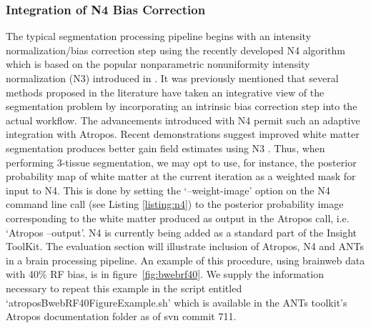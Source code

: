 \documentclass[11pt,english]{article}
\begin{document}
\subsubsection{Integration of N4 Bias Correction}
The typical segmentation processing pipeline begins with an intensity
normalization/bias correction step using the recently developed N4
algorithm \citep{Tustison2010} which is based on the popular
nonparametric nonuniformity intensity normalization (N3) introduced in \cite{Sled1998}.  It was previously mentioned that
several methods proposed in the literature have taken an integrative
view of the segmentation problem by incorporating an intrinsic bias
correction step into the actual workflow.  The
advancements introduced with N4 permit such an adaptive
integration with Atropos.  Recent demonstrations suggest improved
white matter segmentation produces better gain field estimates using
N3 \citep{Boyes2008}.  Thus, when performing 3-tissue segmentation, we
may opt to use, for instance, the posterior probability map of white matter at the current
iteration as a weighted mask for input to N4.  This is done by setting
the `{\ttfamily --weight-image}' option on the N4 command line call
(see Listing \ref{listing:n4}) to the posterior probability image
corresponding to the white matter produced as output in the Atropos
call, i.e. `{\ttfamily Atropos --output}'.  N4 is
currently being added as a standard part of the Insight ToolKit.  The
evaluation section will illustrate inclusion of Atropos, N4 and ANTs
in a brain processing pipeline.  An example of this procedure, using brainweb data with
40\% RF bias, is in figure~\ref{fig:bwebrf40}.  We supply the
information necessary to repeat this example in the script entitled
`{\ttfamily  atroposBwebRF40FigureExample.sh}' which is available in the ANTs toolkit's Atropos
documentation folder as of svn commit 711.
\end{document}
